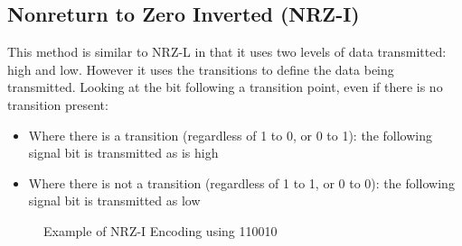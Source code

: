 \subsection{Nonreturn to Zero Inverted (NRZ-I)}
This method is similar to NRZ-L in that it uses two levels of data transmitted: high and low. However it uses the transitions to define the data being transmitted. Looking at the bit following a transition point, even if there is no transition present:
\begin{itemize}
    \item Where there is a transition (regardless of 1 to 0, or 0 to 1): the following signal bit is transmitted as is high
    \item Where there is not a transition (regardless of 1 to 1, or 0 to 0): the following signal bit is transmitted as low
\end{itemize}

\begin{figure}[H]
\centering
{}
\caption{Example of NRZ-I Encoding using 110010}
\end{figure}

